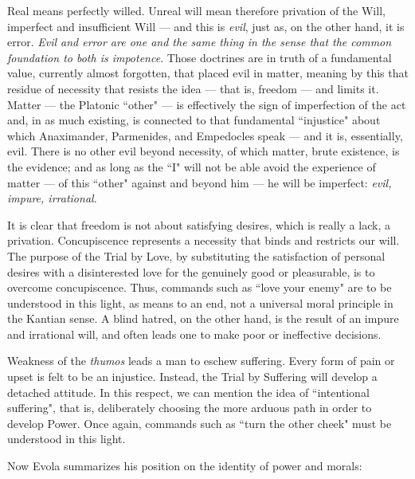 \begin{quotex}
Real means perfectly willed. Unreal will mean therefore privation of the Will, imperfect and insufficient Will — and this is \emph{evil}, just as, on the other hand, it is error. \emph{Evil and error are one and the same thing in the sense that the common foundation to both is impotence}. Those doctrines are in truth of a fundamental value, currently almost forgotten, that placed evil in matter, meaning by this that residue of necessity that resists the idea — that is, freedom — and limits it. Matter — the Platonic ``other" — is effectively the sign of imperfection of the act and, in as much existing, is connected to that fundamental ``injustice" about which Anaximander, Parmenides, and Empedocles speak — and it is, essentially, evil. There is no other evil beyond necessity, of which matter, brute existence, is the evidence; and as long as the ``I" will not be able avoid the experience of matter — of this ``other" against and beyond him — he will be imperfect: \emph{evil, impure, irrational}. 

\end{quotex}
It is clear that freedom is not about satisfying desires, which is really a lack, a privation. Concupiscence represents a necessity that binds and restricts our will. The purpose of the Trial by Love, by substituting the satisfaction of personal desires with a disinterested love for the genuinely good or pleasurable, is to overcome concupiscence. Thus, commands such as ``love your enemy" are to be understood in this light, as means to an end, not a universal moral principle in the Kantian sense. A blind hatred, on the other hand, is the result of an impure and irrational will, and often leads one to make poor or ineffective decisions.

Weakness of the \emph{thumos} leads a man to eschew suffering. Every form of pain or upset is felt to be an injustice. Instead, the Trial by Suffering will develop a detached attitude. In this respect, we can mention the idea of ``intentional suffering", that is, deliberately choosing the more arduous path in order to develop Power. Once again, commands such as ``turn the other cheek" must be understood in this light.

Now Evola summarizes his position on the identity of power and morals:

